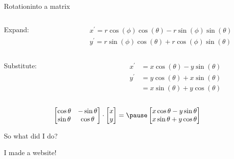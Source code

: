 \documentclass{beamer}
\begin{document}
\begin{frame}{Rotation}{into a matrix}

  \begin{columns}
    \begin{column}{0.3\textwidth}
      Expand: \pause
    \end{column}
    \begin{column}{0.7\textwidth}
      \begin{align*}
        x^{\prime} = r\cos{(\phi)}\cos(\theta) - r\sin{(\phi)}\sin(\theta) \\
        y^{\prime} = r\sin{(\phi)}\cos(\theta) + r\cos{(\phi)}\sin(\theta)
      \end{align*} \pause
    \end{column}
  \end{columns}

  \begin{columns}
    \begin{column}{0.3\textwidth}
      Substitute: \pause
    \end{column}
    \begin{column}{0.7\textwidth}
      \begin{align*}
        x^{\prime} &= x\cos(\theta) - y\sin(\theta) \\
        y^{\prime} &= y\cos(\theta) + x\sin(\theta) \\
                   &= x\sin(\theta) + y\cos(\theta)
      \end{align*} \pause
    \end{column}
  \end{columns}


  \[
    \begin{bmatrix}
      \cos{\theta} & -\sin{\theta} \\
      \sin{\theta} & \cos{\theta}
    \end{bmatrix}
    \cdot
    \begin{bmatrix}
      x \\ y
    \end{bmatrix}
    = \pause
    \begin{bmatrix}
      x\cos{\theta} - y\sin{\theta} \\
      x\sin{\theta} + y\cos{\theta}
    \end{bmatrix}
  \]

\end{frame}

\begin{frame}{So what did I do?}
  
  \begin{center}
    \huge I made a website!

    \vspace{1cm}


  \end{center}

\end{frame}
\end{document}
